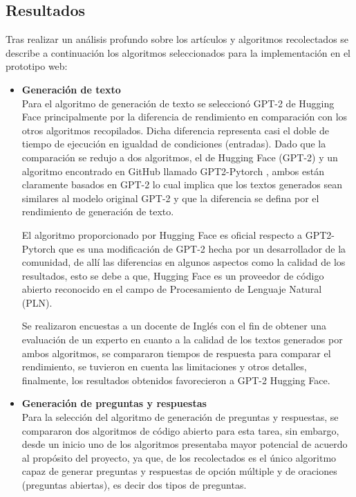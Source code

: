 \documentclass[../Main.tex]{subfiles}
\begin{document}
\subsection{Resultados}
\begin{justify}
Tras realizar un análisis profundo sobre los artículos y algoritmos recolectados se describe a continuación los algoritmos seleccionados para la implementación en el prototipo web:

\begin{itemize}
    \item \textbf{Generación de texto}\\
    Para el algoritmo de generación de texto se seleccionó GPT-2 de Hugging Face \cite{43} principalmente por la diferencia de rendimiento en comparación con los otros algoritmos recopilados. Dicha diferencia representa casi el doble de tiempo de ejecución en igualdad de condiciones (entradas). Dado que la comparación se redujo a dos algoritmos, el de Hugging Face (GPT-2) y un algoritmo encontrado en GitHub llamado GPT2-Pytorch \cite{44}, ambos están claramente basados en GPT-2 lo cual implica que los textos generados sean similares al modelo original GPT-2 y que la diferencia se defina por el rendimiento de generación de texto.
    
    El algoritmo proporcionado por Hugging Face es oficial respecto a GPT2-Pytorch que es una modificación de GPT-2 hecha por un desarrollador de la comunidad, de allí las diferencias en algunos aspectos como la calidad de los resultados, esto se debe a que, Hugging Face es un proveedor de código abierto reconocido en el campo de Procesamiento de Lenguaje Natural (PLN).
    
    Se realizaron encuestas a un docente de Inglés con el fin de obtener una evaluación de un experto en cuanto a la calidad de los textos generados por ambos algoritmos, se compararon tiempos de respuesta para comparar el rendimiento, se tuvieron en cuenta las limitaciones y otros detalles, finalmente, los resultados obtenidos favorecieron a GPT-2 Hugging Face.
    
    \item \textbf{Generación de preguntas y respuestas}\\
    Para la selección del algoritmo de generación de preguntas y respuestas, se compararon dos algoritmos de código abierto para esta tarea, sin embargo, desde un inicio uno de los algoritmos presentaba mayor potencial de acuerdo al propósito del proyecto, ya que, de los recolectados es el único algoritmo capaz de generar preguntas y respuestas de opción múltiple y de oraciones (preguntas abiertas), es decir dos tipos de preguntas.
    

\end{itemize}
\end{justify}
\end{document}
